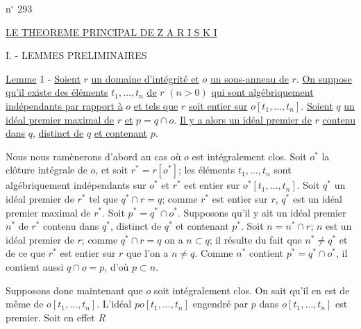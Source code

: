 n$^\circ$ 293

\uline{LE THEOREME PRINCIPAL DE Z A R I S K I}

I. - LEMMES PRELIMINAIRES

\uline{Lemme} 1 - \uline{Soient} $r$ \uline{un domaine d'intégrité et} $o$ \uline{un sous-anneau de} $r$. \uline{On suppose qu'il existe des éléments} $t_1,\ldots,t_n$ \uline{de} $r$ $(n>0)$ \uline{qui sont algébriquement indépendants par rapport à} $o$ \uline{et tels que} $r$ \uline{soit entier sur} $o[t_1,\ldots,t_n]$. \uline{Soient} $q$ \uline{un idéal premier maximal de} $r$ \uline{et} $p=q\cap o$. \uline{Il y a alors un idéal premier de} $r$ \uline{contenu dans} $q$, \uline{distinct de} $q$ \uline{et contenant} $p$.

Nous nous ramènerons d'abord au cas où $o$ est intégralement clos. Soit $o^*$ la clôture intégrale de $o$, et soit $r^*=r[o^*]$; les éléments $t_1,\ldots,t_n$ sont algébriquement indépendants sur $o^*$ et $r^*$ est entier sur $o^*[t_1,\ldots,t_n]$. Soit $q^*$ un idéal premier de $r^*$ tel que $q^*\cap r=q$; comme $r^*$ est entier sur $r$, $q^*$ est un idéal premier maximal de $r^*$. Soit $p^*=q^*\cap o^*$. Supposons qu'il y ait un idéal premier $n^*$ de $r^*$ contenu dans $q^*$, distinct de $q^*$ et contenant $p^*$. Soit $n=n^*\cap r$; $n$ est un idéal premier de $r$; comme $q^*\cap r=q$ on a $n\subset q$; il résulte du fait que $n^*\ne q^*$ et de ce que $r^*$ est entier sur $r$ que l'on a $n\ne q$. Comme $n^*$ contient $p^*=q^*\cap o^*$, il contient aussi $q\cap o=p$, d'où $p\subset n$.

Supposons donc maintenant que $o$ soit intégralement clos. On sait qu'il en est de même de $o[t_1,\ldots,t_n]$. L'idéal $po[t_1,\ldots,t_n]$ engendré par $p$ dans $o[t_1,\ldots,t_n]$ est premier. Soit en effet $R$
